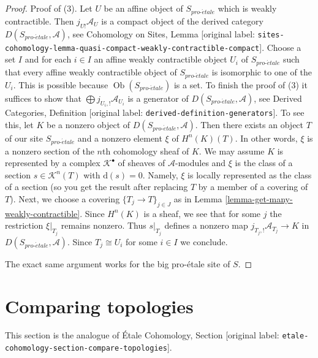 \documentclass[10pt,a4paper]{article}
\theoremstyle{plain}
\theoremstyle{definition}
\theoremstyle{remark}
\numberwithin{equation}{subsection}
\def\Ob{\mathop{\mathrm{Ob}}\nolimits}
\def\proetale{{pro\text{-}\acute{e}tale}}
\begin{document}
\begin{proof}
Proof of (3). Let $U$ be an affine object of $S_\proetale$ which is
weakly contractible. Then $j_{U!}\mathcal{A}_U$ is a compact object
of the derived category $D(S_\proetale, \mathcal{A})$, see
Cohomology on Sites, Lemma
\textnormal{[original label: \nolinkurl{sites-cohomology-lemma-quasi-compact-weakly-contractible-compact}]}.
Choose a set $I$ and for each $i \in I$ an affine weakly contractible
object $U_i$ of $S_\proetale$ such that every affine weakly contractible
object of $S_\proetale$ is isomorphic to one of the $U_i$. This is possible
because $\Ob(S_\proetale)$ is a set. To finish the proof of (3) it suffices
to show that $\bigoplus j_{U_i, !}\mathcal{A}_{U_i}$ is a generator
of $D(S_\proetale, \mathcal{A})$, see
Derived Categories, Definition \textnormal{[original label: \nolinkurl{derived-definition-generators}]}.
To see this, let $K$ be a nonzero object
of $D(S_\proetale, \mathcal{A})$. Then there exists an object $T$
of our site $S_\proetale$ and a nonzero element $\xi$ of $H^n(K)(T)$.
In other words, $\xi$ is a nonzero section of the $n$th cohomology
sheaf of $K$.
We may assume $K$ is represented by a complex $\mathcal{K}^\bullet$
of sheaves of $\mathcal{A}$-modules and $\xi$ is the class of a
section $s \in \mathcal{K}^n(T)$ with $\text{d}(s) = 0$.
Namely, $\xi$ is locally represented as the class of a section
(so you get the result after replacing $T$ by a member of a covering of $T$).
Next, we choose a covering $\{T_j \to T\}_{j \in J}$
as in Lemma \ref{lemma-get-many-weakly-contractible}.
Since $H^n(K)$ is a sheaf, we see that for some $j$ the restriction
$\xi|_{T_j}$ remains nonzero. Thus $s|_{T_j}$ defines a nonzero map
$j_{T_j, !}\mathcal{A}_{T_j} \to K$ in $D(S_\proetale, \mathcal{A})$.
Since $T_j \cong U_i$ for some $i \in I$ we conclude.

\medskip\noindent
The exact same argument works for the big pro-\'etale site of $S$.
\end{proof}







\section{Comparing topologies}
\label{section-compare-topologies}

\noindent
This section is the analogue of
\'Etale Cohomology, Section \textnormal{[original label: \nolinkurl{etale-cohomology-section-compare-topologies}]}.
\end{document}
